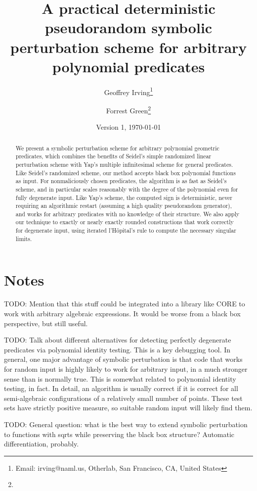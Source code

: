 \documentclass[11pt]{article}
\title{A practical deterministic pseudorandom symbolic perturbation scheme for arbitrary polynomial predicates}
\author{Geoffrey Irving\thanks{Email: irving@naml.us, Otherlab, San Francisco, CA, United States}
\and Forrest Green\thanks{\TODO}}
\date{Version 1, \today}
\newcommand{\TODO}{{\color{red} TODO}}
\begin{document}
\maketitle

\begin{abstract}
We present a symbolic perturbation scheme for arbitrary polynomial geometric predicates, which combines the benefits of
Seidel's simple randomized linear perturbation scheme with Yap's multiple infinitesimal scheme for general predicates.
Like Seidel's randomized scheme, our method accepts black box polynomial functions as input.
For nonmaliciously chosen predicates, the algorithm is as fast as Seidel's scheme, and in particular scales reasonably
with the degree of the polynomial even for fully degenerate input.  Like Yap's scheme, the computed sign is deterministic,
never requiring an algorithmic restart (assuming a high quality pseudorandom generator), and works for arbitrary
predicates with no knowledge of their structure.  We also apply our technique to exactly or nearly exactly rounded
constructions that work correctly for degenerate input, using iterated l'H\^opital's rule to compute the necessary
singular limits.
\end{abstract}

\section{Notes}

\TODO: Mention that this stuff could be integrated into a library like CORE to work with arbitrary algebraic expressions.
It would be worse from a black box perspective, but still useful.

\TODO: Talk about different alternatives for detecting perfectly degenerate predicates via polynomial identity testing.  This is a key debugging tool.  In general, one major advantage of symbolic perturbation is that code that works for random input is highly likely to work for arbitrary input, in a much stronger sense than is normally true.  This is somewhat related to polynomial identity testing, in fact.
In detail, an algorithm is usually correct if it is correct for all semi-algebraic configurations of a relatively small number of points.  These test sets have strictly positive measure, so suitable random input will likely find them.

\TODO: General question: what is the best way to extend symbolic perturbation to functions with sqrts while preserving the black box structure?  Automatic differentiation, probably.
\end{document}
